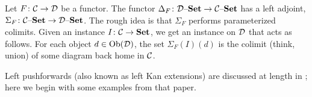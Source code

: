 \documentclass[CT4S-EN-RU]{subfiles}
\begin{document}

\subsubsection{}\label{sec:left push}

\begin{blockENG}
Let $F\colon\mathcal{C}\rightarrow\mathcal{D}$ be a functor. The functor $\Delta_F\colon\mathcal{D}{\text \textendash}{\bf Set}\rightarrow\mathcal{C}{\text \textendash}{\bf Set}$ has a left adjoint, $\Sigma_F\colon\mathcal{C}{\text \textendash}{\bf Set}\rightarrow\mathcal{D}{\text \textendash}{\bf Set}$. The rough idea is that $\Sigma_F$ performs parameterized colimits. Given an instance $I\colon\mathcal{C}\rightarrow{\bf Set}$, we get an instance on $\mathcal{D}$ that acts as follows. For each object $d\in\textnormal{Ob}(\mathcal{D})$, the set $\Sigma_F(I)(d)$ is the colimit (think, union) of some diagram back home in $\mathcal{C}$. 
\end{blockENG}

\begin{blockRUS}
\end{blockRUS}

\begin{blockENG}
Left pushforwards (also known as left Kan extensions) are discussed at length in \cite{Sp1}; here we begin with some examples from that paper.
\end{blockENG}

\begin{blockRUS}
\end{blockRUS}
\end{document}
